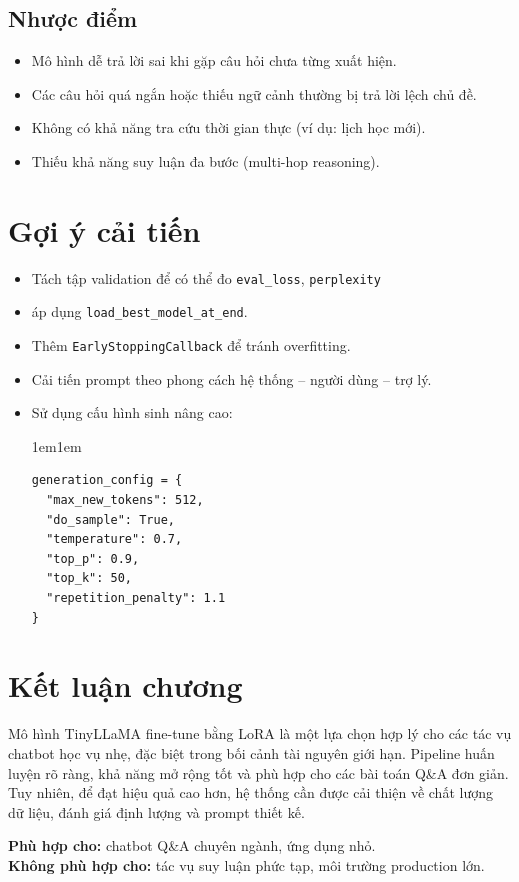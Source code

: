 \documentclass[../DoAn.tex]{subfiles}
\begin{document}
\subsection{Nhược điểm}
\begin{itemize}
    \item Mô hình dễ trả lời sai khi gặp câu hỏi chưa từng xuất hiện.
    \item Các câu hỏi quá ngắn hoặc thiếu ngữ cảnh thường bị trả lời lệch chủ đề.
    \item Không có khả năng tra cứu thời gian thực (ví dụ: lịch học mới).
    \item Thiếu khả năng suy luận đa bước (multi-hop reasoning).
\end{itemize}

\section{Gợi ý cải tiến}

\begin{itemize}
    \item Tách tập validation để có thể đo \texttt{eval\_loss}, \texttt{perplexity}
    \item áp dụng \texttt{load\_best\_model\_at\_end}.
    \item Thêm \texttt{EarlyStoppingCallback} để tránh overfitting.
    \item Cải tiến prompt theo phong cách hệ thống – người dùng – trợ lý.
    \item Sử dụng cấu hình sinh nâng cao:
    \begin{adjustwidth}{1em}{1em}
    \begin{lstlisting}[language=none,breaklines=true,basicstyle=\ttfamily\footnotesize]
generation_config = {
  "max_new_tokens": 512,
  "do_sample": True,
  "temperature": 0.7,
  "top_p": 0.9,
  "top_k": 50,
  "repetition_penalty": 1.1
}
\end{lstlisting}
    \end{adjustwidth}
\end{itemize}
\section{Kết luận chương}

Mô hình TinyLLaMA fine-tune bằng LoRA là một lựa chọn hợp lý cho các tác vụ chatbot học vụ nhẹ, đặc biệt trong bối cảnh tài nguyên giới hạn. Pipeline huấn luyện rõ ràng, khả năng mở rộng tốt và phù hợp cho các bài toán Q\&A đơn giản. Tuy nhiên, để đạt hiệu quả cao hơn, hệ thống cần được cải thiện về chất lượng dữ liệu, đánh giá định lượng và prompt thiết kế.

\textbf{Phù hợp cho:} chatbot Q\&A chuyên ngành, ứng dụng nhỏ. \\
\textbf{Không phù hợp cho:} tác vụ suy luận phức tạp, môi trường production lớn.
\end{document}
